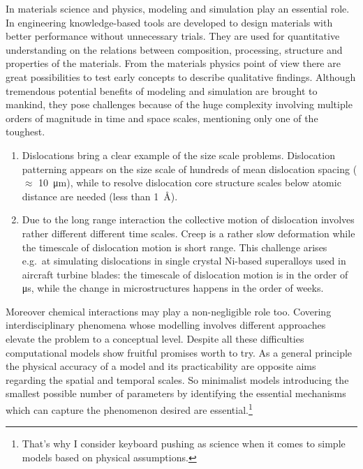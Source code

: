 In materials science and physics, modeling and simulation play an essential role. In engineering knowledge-based tools are developed to design materials with better performance without unnecessary trials. They are used for quantitative understanding on the relations between composition, processing, structure and properties of the materials. From the materials physics point of view there are great possibilities to test early concepts to describe qualitative findings. Although tremendous potential benefits of modeling and simulation are brought to mankind, they pose challenges because of the huge complexity involving multiple orders of magnitude in time and space scales, mentioning only one of the toughest.
\begin{enumerate}
\item Dislocations bring a clear example of the size scale problems. Dislocation patterning appears on the size scale of hundreds of mean dislocation spacing 
($ \approx $ \SI{10}{\um}), while to resolve dislocation core structure scales below atomic distance are needed
(less than \SI{1}{\angstrom}).
\item Due to the long range interaction the collective motion of dislocation involves rather different different time scales. Creep is a rather slow deformation while the timescale of dislocation motion is short range. This challenge arises e.g.\ at simulating dislocations in single crystal Ni-based superalloys used in aircraft turbine blades: the timescale of dislocation motion is in the order of \si{\us}, while the change in microstructures happens in the order of weeks.
\end{enumerate}
Moreover chemical interactions may play a non-negligible role too. Covering interdisciplinary phenomena whose modelling involves different approaches elevate the problem to a conceptual level. Despite all these difficulties computational models show fruitful promises worth to try. As a general principle the physical accuracy of a model and its practicability are opposite aims regarding the spatial and temporal scales. So minimalist models introducing the smallest possible number of parameters by identifying the essential mechanisms which can capture the phenomenon desired are essential.\footnote{That's why I consider keyboard pushing as science when it comes to simple models based on physical assumptions.}

